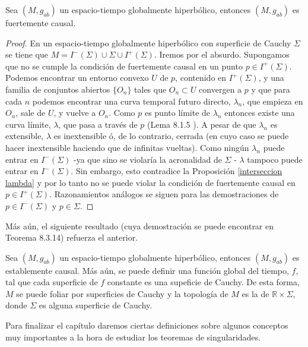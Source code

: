 \begin{lemma}
Sea $(M,g_{ab})$ un espacio-tiempo globalmente hiperbólico, entonces $(M,g_{ab})$ es fuertemente causal.
\end{lemma}
\begin{proof}
En un espacio-tiempo globalmente hiperbólico con superficie de Cauchy $\Sigma$ se tiene que $M=I^-(\Sigma) \cup \Sigma \cup I^+(\Sigma)$. Iremos por el absurdo. Supongamos que no se cumple la condición de fuertemente causal en un punto $p\in I^+(\Sigma)$. Podemos encontrar un entorno convexo $U$ de $p$, contenido en $I^+(\Sigma)$, y una familia de conjuntos abiertos $\{O_n\}$ tales que $O_n\subset U$ convergen a $p$ y que para cada $n$ podemos encontrar una curva temporal futuro directo, $\lambda_n$, que empieza en $O_n$, sale de $U$, y vuelve a $O_n$. Como $p$ es punto límite de $\lambda_n$ entonces existe una curva límite, $\lambda$, que pasa a través de $p$ (Lema 8.1.5 \citep{1984ucp..book.....W}). A pesar de que $\lambda_n$ es extensible, $\lambda$ es inextensible ó, de lo contrario, cerrada (en cuyo caso se puede hacer inextensible haciendo que de infinitas vueltas). Como ningún $\lambda_n$ puede entrar en $I^-(\Sigma)$ -ya que sino se violaría la acronalidad de $\Sigma$ - $\lambda$ tampoco puede entrar en $I^-(\Sigma)$. Sin embargo, esto contradice la Proposición \ref{interseccion lambda} y por lo tanto no se puede violar la condición de fuertemente causal en $p\in I^+(\Sigma)$. Razonamientos análogos se siguen para las demostraciones de $p\in I^-(\Sigma)$ y $p\in \Sigma$.
\end{proof}


Más aún, el siguiente resultado (cuya demostración se puede encontrar en \citep{1984ucp..book.....W} Teorema 8.3.14) refuerza el anterior.
 
\begin{theorem}\label{Teo 8.3.14 Wald}
Sea $(M,g_{ab})$ un espacio-tiempo globalmente hiperbólico, entonces $(M,g_{ab})$ es establemente causal. Más aún, se puede definir una función global del tiempo, $f$, tal que cada superficie de $f$ constante es una supeficie de Cauchy. De esta forma, $M$ se puede foliar por superficies de Cauchy y la topología de $M$ es la de $\mathbb{R}\times\Sigma$, donde $\Sigma$ es alguna superficie de Cauchy.
\end{theorem}

Para finalizar el capítulo daremos ciertas definiciones sobre algunos conceptos muy importantes a la hora de estudiar los teoremas de singularidades.

